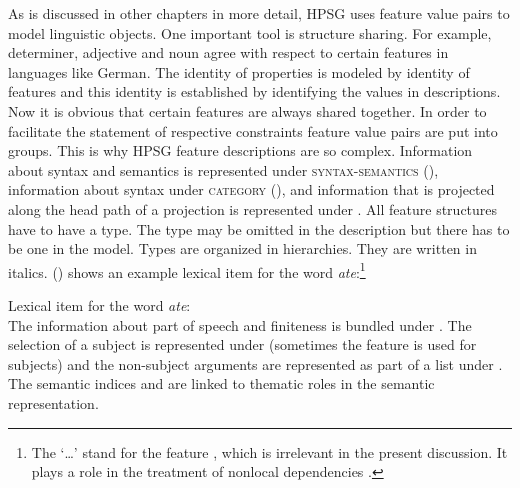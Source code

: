 \documentclass[output=paper]{langsci/langscibook}
\begin{document}
As is discussed in other chapters in more detail, HPSG uses feature value pairs to model linguistic
objects. One important tool is structure sharing. For example, determiner, adjective and noun agree
with respect to certain features in languages like German. The identity of properties is modeled by
identity of features and this identity is established by identifying the values in descriptions. Now
it is obvious that certain features are always shared together. In order to facilitate the statement
of respective constraints feature value pairs are put into groups. This is why HPSG feature
descriptions are so complex. Information about syntax and semantics is represented under
\textsc{syntax-semantics} (\synsem), information about syntax under \textsc{category} (\cat), and
information that is projected along the head path of a projection is represented under \head. All
feature structures have to have a type. The type may be omitted in the description but there has to
be one in the model. Types are organized in hierarchies. They are written in italics. ()
shows an example lexical item for the word \emph{ate}:\footnote{
  The `\ldots' stand for the feature \local, which is irrelevant in the present discussion. It plays
  a role in the treatment of nonlocal dependencies .
}

\eas
\label{le-ate}
Lexical item for the word \emph{ate}:\\
\zs
The information about part of speech and finiteness is bundled under \head. The selection of a
subject is represented under \spr (sometimes the feature \subj is used for subjects) and the
non-subject arguments are represented as part of a list under \comps. The semantic indices 
and  are linked to thematic roles in the semantic representation.
\end{document}
